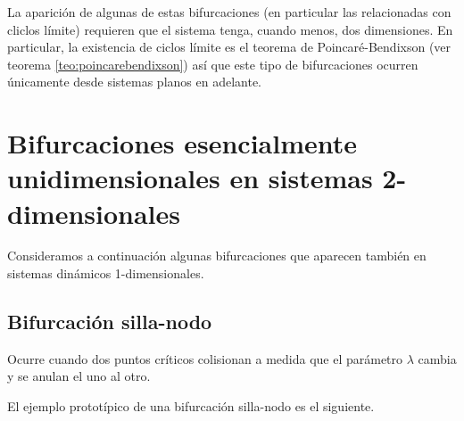 \documentclass[11pt]{book}
\theoremstyle{definition}
\numberwithin{definition}{section}
\theoremstyle{theorem}
\numberwithin{theorem}{section}
\numberwithin{lemma}{section}
\numberwithin{corollary}{section}
\theoremstyle{plain}
\numberwithin{example}{section}
\begin{document}
La aparición de algunas de estas bifurcaciones (en particular las relacionadas con cliclos límite) requieren que el sistema tenga, cuando menos, dos dimensiones. En particular, la existencia de ciclos límite es el teorema de Poincaré-Bendixson (ver teorema \ref{teo:poincarebendixson}) así que este tipo de bifurcaciones ocurren únicamente desde sistemas planos en adelante.

\section{Bifurcaciones esencialmente unidimensionales en sistemas 2-dimensionales}

Consideramos a continuación algunas bifurcaciones que aparecen también en sistemas dinámicos 1-dimensionales.

\subsection{Bifurcación silla-nodo}
Ocurre cuando dos puntos críticos colisionan a medida que el parámetro $\lambda$ cambia y se anulan el uno al otro.

El ejemplo prototípico de una bifurcación silla-nodo es el siguiente.
\end{document}
